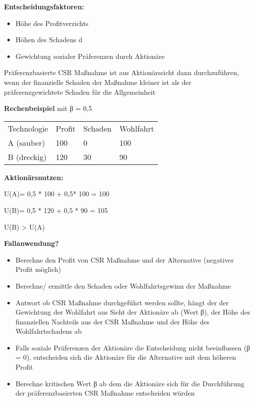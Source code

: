 \documentclass[
]{article}
\providecommand{\tightlist}{%
  \setlength{\itemsep}{0pt}\setlength{\parskip}{0pt}}
\begin{document}
\textbf{Entscheidungsfaktoren:}

\begin{itemize}
\tightlist
\item
  Höhe des Profitverzichts
\item
  Höhen des Schadens d
\item
  Gewichtung sozialer Präferenzen durch Aktionäre
\end{itemize}

Präferenzbasierte CSR Maßnahme ist aus Aktionärssicht dann
durchzuführen, wenn der finanzielle Schaden der Maßnahme kleiner ist als
der präferenzgewichtete Schaden für die Allgemeinheit

\textbf{Rechenbeispiel} mit β = 0,5

\begin{longtable}[]{@{}llll@{}}
\toprule
\endhead
Technologie & Profit & Schaden & Wohlfahrt \\
A (sauber) & 100 & 0 & 100 \\
B (dreckig) & 120 & 30 & 90 \\
\bottomrule
\end{longtable}

\textbf{Aktionärsnutzen:}

U(A)= 0,5 * 100 + 0,5* 100 = 100

U(B)= 0,5 * 120 + 0,5 * 90 = 105

U(B) \textgreater{} U(A)

\textbf{Fallanwendung?}

\begin{itemize}
\tightlist
\item
  Berechne den Profit von CSR Maßnahme und der Alternative (negativer
  Profit möglich)
\item
  Berechne/ ermittle den Schaden oder Wohlfahrtsgewinn der Maßnahme
\item
  Antwort ob CSR Maßnahme durchgeführt werden sollte, hängt der der
  Gewichtung der Wohlfahrt aus Sicht der Aktionäre ab (Wert β), der Höhe
  des finanziellen Nachteils aus der CSR Maßnahme und der Höhe des
  Wohlfahrtschadens ab
\item
  Falls soziale Präferenzen der Aktionäre die Entscheidung nicht
  beeinflussen (β = 0), entscheiden sich die Aktionäre für die
  Alternative mit dem höheren Profit
\item
  Berechne kritischen Wert β ab dem die Aktionäre sich für die
  Durchführung der präferenzbasierten CSR Maßnahme entscheiden würden
\end{itemize}
\end{document}

